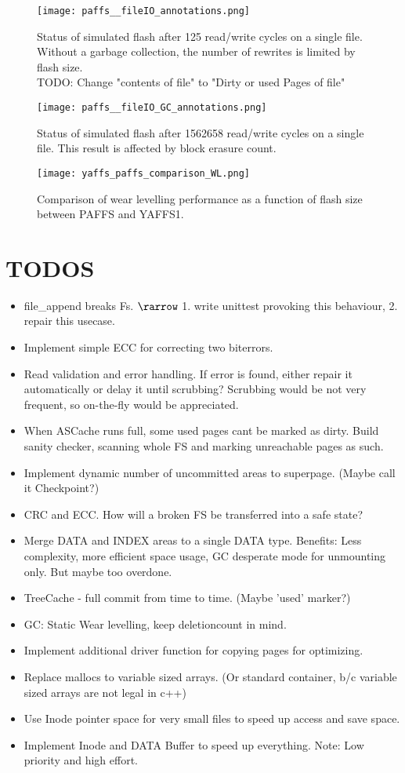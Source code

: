 \begin{figure}[htp]
	\centering\texttt{[image: paffs\_\_fileIO\_annotations.png]}
	\caption{\label{fig:fileIO} Status of simulated flash after 125 read/write cycles on a single file. Without a garbage collection, the number of rewrites is limited by flash size.\\TODO: Change "contents of file" to "Dirty or used Pages of file"}
\end{figure}
\begin{figure}[htp]
	\centering\texttt{[image: paffs\_\_fileIO\_GC\_annotations.png]}
	\caption{\label{fig:fileIO} Status of simulated flash after 1562658 read/write cycles on a single file. This result is affected by block erasure count.}
\end{figure}
\begin{figure}[htp]
	\centering\texttt{[image: yaffs\_paffs\_comparison\_WL.png]}
	\caption{\label{fig:fileIOCompare} Comparison of wear levelling performance as a function of flash size between PAFFS and YAFFS1.}
\end{figure}


\appendix
\section{TODOS}
\begin{itemize}
    \item file_append breaks Fs. $\rarrow$ 1. write unittest provoking this behaviour, 2. repair this usecase.
    \item Implement simple ECC for correcting two biterrors.
    \item Read validation and error handling. If error is found, either repair it automatically or delay it until scrubbing? Scrubbing would be not very frequent, so on-the-fly would be appreciated.
	\item When ASCache runs full, some used pages cant be marked as dirty. Build sanity checker, scanning whole FS and marking unreachable pages as such.
	\item Implement dynamic number of uncommitted areas to superpage. (Maybe call it Checkpoint?)
	\item CRC and ECC. How will a broken FS be transferred into a safe state?
	\item Merge DATA and INDEX areas to a single DATA type. Benefits: Less complexity, more efficient space usage, GC desperate mode for unmounting only. But maybe too overdone.
	\item TreeCache - full commit from time to time. (Maybe 'used' marker?)
	\item GC: Static Wear levelling, keep deletioncount in mind.
	\item Implement additional driver function for copying pages for optimizing.
	\item Replace mallocs to variable sized arrays. (Or standard container, b/c variable sized arrays are not legal in c++)
	\item Use Inode pointer space for very small files to speed up access and save space.
	\item Implement Inode and DATA Buffer to speed up everything. Note: Low priority and high effort.
\end{itemize}

